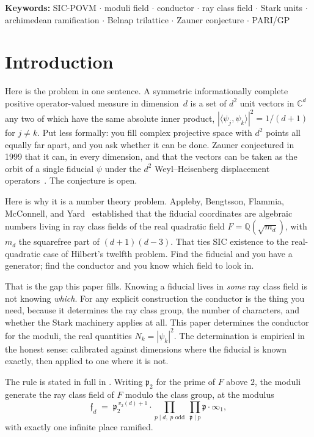 \documentclass[12pt,a4paper]{article}
\newcommand{\Fd}{F}
\newcommand{\md}{m_d}
\newcommand{\pt}{\mathfrak{p}_2}
\begin{document}
\noindent\textbf{Keywords:} SIC-POVM \(\cdot\) moduli field \(\cdot\) conductor
\(\cdot\) ray class field \(\cdot\) Stark units \(\cdot\) archimedean ramification
\(\cdot\) Belnap trilattice \(\cdot\) Zauner conjecture \(\cdot\) PARI/GP

\newpage
\tableofcontents
\newpage

\section{Introduction}
\label{sec:intro}

Here is the problem in one sentence. A symmetric informationally complete
positive operator-valued measure in dimension~$d$ is a set of $d^2$ unit vectors
in $\mathbb{C}^d$ any two of which have the same absolute inner product,
$|\langle\psi_j,\psi_k\rangle|^2 = 1/(d+1)$ for $j \neq k$. Put less formally:
you fill complex projective space with $d^2$ points all equally far apart, and
you ask whether it can be done. Zauner conjectured in 1999 that it can, in every
dimension, and that the vectors can be taken as the orbit of a single fiducial
$\psi$ under the $d^2$ Weyl--Heisenberg displacement operators~\cite{Zauner1999}.
The conjecture is open.

Here is why it is a number theory problem. Appleby, Bengtsson, Flammia,
McConnell, and Yard~\cite{Appleby2013,Appleby2017,AFMY2020} established that the
fiducial coordinates are algebraic numbers living in ray class fields of the
real quadratic field $\Fd = \mathbb{Q}(\sqrt{\md})$, with $\md$ the squarefree
part of $(d+1)(d-3)$. That ties SIC existence to the real-quadratic case of
Hilbert's twelfth problem. Find the fiducial and you have
a generator; find the conductor and you know which field to look in.

That is the gap this paper fills. Knowing a fiducial lives in \emph{some} ray
class field is not knowing \emph{which}. For any explicit construction the
conductor is the thing you need, because it determines the ray class group, the
number of characters, and whether the Stark machinery applies at all. This paper
determines the conductor for the moduli, the real quantities $N_k = |\psi_k|^2$.
The determination is empirical in the honest sense: calibrated against
dimensions where the fiducial is known exactly, then applied to one where it is
not.

The rule is stated in full in . Writing $\pt$ for the prime of
$\Fd$ above $2$, the moduli generate the ray class field of $\Fd$ modulo the
class group, at the modulus
\[
\mathfrak{f}_d \;=\; \pt^{\,v_2(d)+1} \cdot \prod_{p \mid d,\; p \text{ odd}}
\ \prod_{\mathfrak{p} \mid p} \mathfrak{p} \cdot \infty_1,
\]
with exactly one infinite place ramified.
\end{document}
